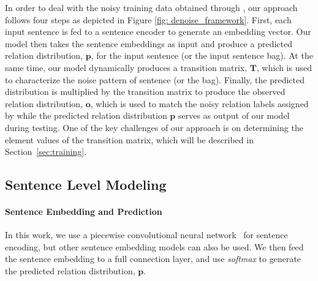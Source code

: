 In order to deal with the noisy training data obtained through \DS, our approach follows four steps as depicted in Figure \ref{fig: denoise_framework}.
First, each input sentence is fed to a sentence encoder to generate an embedding vector. Our model then takes the sentence embeddings as input and produce a predicted relation
distribution, $\mathbf{p}$, for the input sentence (or the input sentence bag). At the same time, our model dynamically produces
a transition matrix, $\mathbf{T}$, which is used to characterize the noise pattern of  %
sentence (or the bag). Finally, the predicted distribution is multiplied by the transition matrix to produce the observed relation
distribution, $\mathbf{o}$, which is used to match the noisy relation labels
assigned by \DS
while the predicted relation distribution $\mathbf{p}$ serves
as output of our model during testing.
One of the key challenges of our approach is on determining the element values of the transition matrix, which will be described in Section~\ref{sec:training}.



\subsection{Sentence Level Modeling}

\paragraph{Sentence Embedding and Prediction}
 In this work, we use a piecewise convolutional neural network~\cite{zeng2015distant} for sentence encoding, but other sentence embedding models can also be used.
We then feed the sentence embedding to a full connection layer, and use \emph{softmax} to generate the predicted relation distribution, $\mathbf{p}$.

